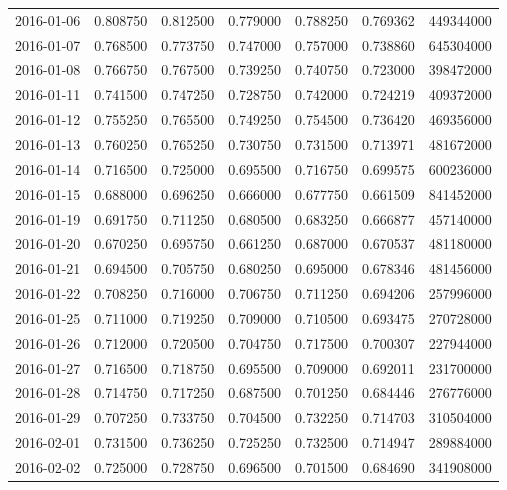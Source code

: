 \begin{tabular}{lrrrrrr}
2016-01-06 &    0.808750 &    0.812500 &    0.779000 &    0.788250 &    0.769362 &   449344000 \\
2016-01-07 &    0.768500 &    0.773750 &    0.747000 &    0.757000 &    0.738860 &   645304000 \\
2016-01-08 &    0.766750 &    0.767500 &    0.739250 &    0.740750 &    0.723000 &   398472000 \\
2016-01-11 &    0.741500 &    0.747250 &    0.728750 &    0.742000 &    0.724219 &   409372000 \\
2016-01-12 &    0.755250 &    0.765500 &    0.749250 &    0.754500 &    0.736420 &   469356000 \\
2016-01-13 &    0.760250 &    0.765250 &    0.730750 &    0.731500 &    0.713971 &   481672000 \\
2016-01-14 &    0.716500 &    0.725000 &    0.695500 &    0.716750 &    0.699575 &   600236000 \\
2016-01-15 &    0.688000 &    0.696250 &    0.666000 &    0.677750 &    0.661509 &   841452000 \\
2016-01-19 &    0.691750 &    0.711250 &    0.680500 &    0.683250 &    0.666877 &   457140000 \\
2016-01-20 &    0.670250 &    0.695750 &    0.661250 &    0.687000 &    0.670537 &   481180000 \\
2016-01-21 &    0.694500 &    0.705750 &    0.680250 &    0.695000 &    0.678346 &   481456000 \\
2016-01-22 &    0.708250 &    0.716000 &    0.706750 &    0.711250 &    0.694206 &   257996000 \\
2016-01-25 &    0.711000 &    0.719250 &    0.709000 &    0.710500 &    0.693475 &   270728000 \\
2016-01-26 &    0.712000 &    0.720500 &    0.704750 &    0.717500 &    0.700307 &   227944000 \\
2016-01-27 &    0.716500 &    0.718750 &    0.695500 &    0.709000 &    0.692011 &   231700000 \\
2016-01-28 &    0.714750 &    0.717250 &    0.687500 &    0.701250 &    0.684446 &   276776000 \\
2016-01-29 &    0.707250 &    0.733750 &    0.704500 &    0.732250 &    0.714703 &   310504000 \\
2016-02-01 &    0.731500 &    0.736250 &    0.725250 &    0.732500 &    0.714947 &   289884000 \\
2016-02-02 &    0.725000 &    0.728750 &    0.696500 &    0.701500 &    0.684690 &   341908000 \\

\end{tabular}
